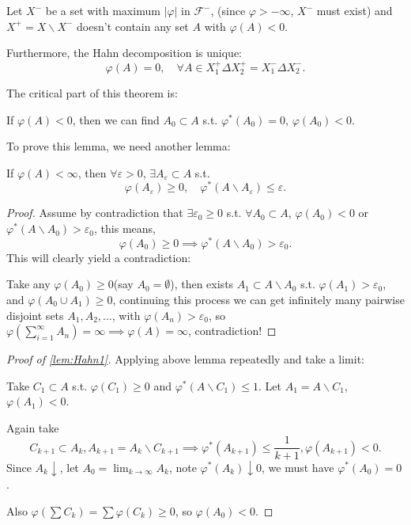 \begin{theorem}
	\label{Hahn decomposition}
    Let $X^-$ be a set with maximum $|\varphi|$ in $\mathscr{F}^-$,
	(since $\varphi > -\infty$, $X^-$ must exist)
	and $X^+ = X \backslash X^-$ doesn't contain any set $A$ with $\varphi(A) < 0$.

	Furthermore, the Hahn decomposition is unique:
	\[
	\varphi(A) = 0, \quad \forall A\in X_1^+\Delta X_2^+
	= X_1^- \Delta X_2^-.
	\]
\end{theorem}
The critical part of this theorem is:
\begin{lemma}
	\label{lem:Hahn1}
	If $\varphi(A) < 0$, then we can find $A_0 \subset A$ s.t. $\varphi^*(A_0) = 0$,
	$\varphi(A_0) < 0$.
\end{lemma}

To prove this lemma, we need another lemma:
\begin{lemma}
	If $\varphi(A) < \infty$, then $\forall \varepsilon>0$,
	$\exists A_\varepsilon \subset A$ s.t.
	\[
		\varphi(A_\varepsilon) \ge 0,\quad
		\varphi^*(A \backslash A_\varepsilon) \le \varepsilon.
	\]
\end{lemma}
\begin{proof}[Proof]
    Assume by contradiction that $\exists \varepsilon_0\ge 0$ s.t.
	$\forall A_0 \subset A$, $\varphi(A_0)<0$ or
	$\varphi^*(A \backslash A_0) > \varepsilon_0$,
	this means,
	\[
		\varphi(A_0)\ge 0\implies \varphi^*(A \backslash A_0) > \varepsilon_0.
	\]
	This will clearly yield a contradiction:

	Take any $\varphi(A_0) \ge 0$(say $A_0=\emptyset$),
	then exists $A_1 \subset A\backslash A_0$ s.t.
	$\varphi(A_1) > \varepsilon_0$, and $\varphi(A_0\cup A_1) \ge 0$,
	continuing this process we can get infinitely many pairwise disjoint
	sets $A_1, A_2,\dots$, with $\varphi(A_n) > \varepsilon_0$,
	so $\varphi(\sum_{i=1}^\infty A_n) = \infty\implies \varphi(A) = \infty$,
	contradiction!
\end{proof}

\begin{proof}[Proof of \autoref{lem:Hahn1}]
    Applying above lemma repeatedly and take a limit:

	Take $C_1 \subset A$ s.t. $\varphi(C_1) \ge 0$ and
	$\varphi^*(A \backslash C_1)\le 1$.
	Let $A_1 = A \backslash C_1$, $\varphi(A_1) < 0$.

	Again take
	\[
		C_{k+1} \subset A_k, A_{k+1} = A_k \backslash C_{k+1}
		\implies \varphi^*(A_{k+1}) \le \frac{1}{k+1}, \varphi(A_{k+1}) < 0.
	\]
	Since $A_k \downarrow$, let $A_0 = \lim_{k\to \infty} A_k$,
	note $\varphi^*(A_k) \downarrow 0$, we must have $\varphi^*(A_0) = 0$.

	Also $\varphi(\sum C_k) = \sum \varphi(C_k) \ge 0$, so $\varphi(A_0) < 0$.
\end{proof}

